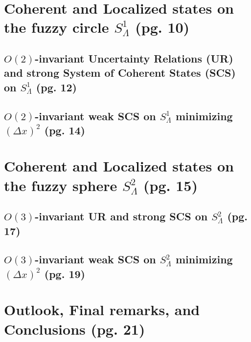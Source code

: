 \documentclass{article}
\begin{document}
\section{Coherent and Localized states on the fuzzy circle $S^1_{\Lambda}$ (pg. 10)}

\subsection{$O(2)$-invariant Uncertainty Relations (UR) and strong System of Coherent States (SCS) on $S^1_\Lambda$ (pg. 12)}

\subsection{$O(2)$-invariant weak SCS on $S^1_\Lambda$ minimizing $(\Delta x)^2$ (pg. 14)}


\section{Coherent and Localized states on the fuzzy sphere $S^2_\Lambda$ (pg. 15)}

\subsection{$O(3)$-invariant UR and strong SCS on $S^2_\Lambda$ (pg. 17)}

\subsection{$O(3)$-invariant weak SCS on $S^2_\Lambda$ minimizing $(\Delta x)^2$ (pg. 19)}

\section{Outlook, Final remarks, and Conclusions (pg. 21)}
\end{document}
